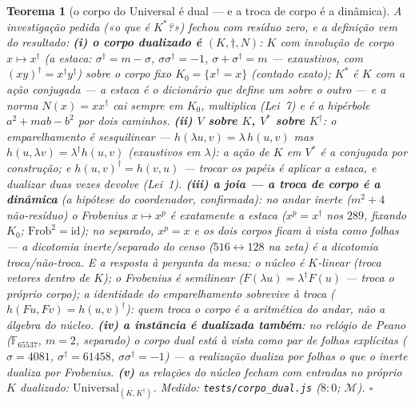 \documentclass[11pt,a4paper]{article}
\newtheorem{teorema}{Teorema}
\newcommand{\code}[1]{\texttt{\small #1}}
\begin{document}
\begin{teorema}[o corpo do Universal é dual --- e a troca de corpo é
a dinâmica]\label{thm:corpo-dual}
A investigação pedida («o que é $K^{*}$?») fechou com resíduo zero, e
a definição \emph{vem do resultado}:
\textbf{(i) o corpo dualizado é $(K,\dagger,N)$}: $K$ com involução
de corpo $x\mapsto x^{\dagger}$ (a estaca: $\sigma^{\dagger}=m-\sigma$,
$\sigma\sigma^{\dagger}=-1$, $\sigma+\sigma^{\dagger}=m$ ---
exaustivos, com $(xy)^{\dagger}=x^{\dagger}y^{\dagger}$) sobre o
corpo fixo $K_{0}=\{x^{\dagger}=x\}$ (contado exato); $K^{*}$ \emph{é}
$K$ com a ação conjugada --- a estaca é o dicionário que define um
sobre o outro --- e a norma $N(x)=x x^{\dagger}$ cai \emph{sempre}
em $K_{0}$, multiplica (Lei~7) e é a hipérbole $a^{2}+mab-b^{2}$ por
dois caminhos.
\textbf{(ii) $V$ sobre $K$, $V^{*}$ sobre $K^{\dagger}$}: o
emparelhamento é \emph{sesquilinear} --- $h(\lambda u,v)=\lambda\,
h(u,v)$ mas $h(u,\lambda v)=\lambda^{\dagger}h(u,v)$ (exaustivos em
$\lambda$): a ação de $K$ em $V^{*}$ é a conjugada \emph{por
construção}; e $h(u,v)^{\dagger}=h(v,u)$ --- trocar os papéis é
aplicar a estaca, e dualizar duas vezes devolve (Lei~1).
\textbf{(iii) a joia --- a troca de corpo é a dinâmica} (a hipótese
do coordenador, confirmada): no andar \emph{inerte} ($m^{2}{+}4$
não-resíduo) o Frobenius $x\mapsto x^{p}$ é \emph{exatamente} a
estaca ($x^{p}=x^{\dagger}$ nos $289$, fixando $K_{0}$;
$\mathrm{Frob}^{2}=\mathrm{id}$); no \emph{separado}, $x^{p}=x$ e os
dois corpos ficam \emph{à vista} como folhas --- a dicotomia
inerte/separado do censo ($516\leftrightarrow128$ na zeta) é a
dicotomia troca/não-troca. E a resposta à pergunta da mesa: o
\emph{núcleo} é $K$-linear (troca vetores \emph{dentro} de $K$); o
\emph{Frobenius} é semilinear ($F(\lambda u)=\lambda^{\dagger}F(u)$
--- troca o próprio corpo); a identidade do emparelhamento
\emph{sobrevive} à troca ($h(Fu,Fv)=h(u,v)^{\dagger}$): \emph{quem
troca o corpo é a aritmética do andar, não a álgebra do núcleo}.
\textbf{(iv) a instância é dualizada também}: no relógio de Peano
($\mathbb{F}_{65537}$, $m{=}2$, separado) o corpo dual está à vista
como par de folhas explícitas ($\sigma=4081$,
$\sigma^{\dagger}=61458$, $\sigma\sigma^{\dagger}=-1$) --- a
realização dualiza por folhas o que o inerte dualiza por Frobenius.
\textbf{(v)} as relações do núcleo fecham com entradas no próprio
$K$ dualizado: $\mathrm{Universal}_{(K,K^{\dagger})}$.
\emph{Medido:} \code{tests/corpo\_dual.js} ($8{:}0$; $\mathcal{M}$).
$\square$
\end{teorema}
\end{document}
